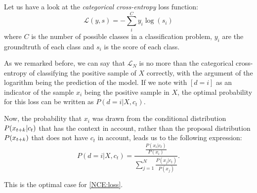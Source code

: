 Let us have a look at the \emph{categorical cross-entropy} loss function:
\[
    \mathcal L(y,s) = -\sum_i^C y_i \log(s_i)    
\]
where $C$ is the number of possible classes in a classification problem, $y_i$ are the groundtruth of each class and $s_i$ is the score of each class.

As we remarked before, we can say that $\mathcal L_N$ is no more than the categorical cross-entropy of classifying the positive sample of $X$ correctly, with the argument of the logarithm being the prediction
of the model. If we note with $[d = i]$ as an indicator of the sample $x_i$ being the positive sample in $X$, the optimal probability for this loss can be written as $P(d = i|X,c_t)$. 

Now, the probability that $x_i$ was drawn from the conditional distribution $P(x_{t+k}|c_t)$ that has the context in account, rather than the proposal distribution $P(x_{t+k})$ that does not have $c_t$ in account, leads us to the following expression:
$$
P(d = i | X , c_t) = \frac{ \frac{P(x_i|c_t)}{P(x_i)}}{\sum_{j=1}^N \frac{P(x_j|c_t)}{P(x_j)}}.
$$

This is the optimal case for \eqref{NCE:loss}.

%
%
%

